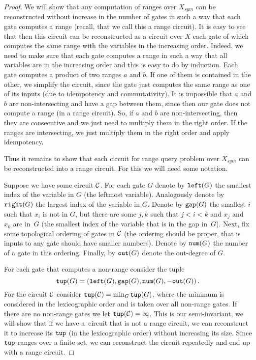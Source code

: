 \documentclass{toc}
\begin{document}
\begin{proof}[Proof]
    We will show that any computation of ranges over $X_{sym}$ can be reconstructed without increase in the number of gates in such a way that each gate computes a range (recall, that we call this a range circuit). It is easy to see that then this circuit can be reconstructed as a circuit over $X$ each gate of which computes the same range with the variables in the increasing order. Indeed, we need to make sure that each gate computes a range in such a way that all variables are in the increasing order and this is easy to do by induction. Each gate computes a product of two ranges $a$ and $b$. If one of them is contained in the other, we simplify the circuit, since the gate just computes the same range as one of its inputs (due to idempotency and commutativity). It is impossible that $a$ and $b$ are non-intersecting and have a gap between them, since then our gate does not compute a range (in a range circuit). So, if $a$ and  $b$ are non-intersecting, then they are consecutive and we just need to multiply them in the right order. If the ranges are intersecting, we just multiply them in the right order and apply idempotency.

    Thus it remains to show that each circuit for range query problem over $X_{sym}$ can be reconstructed into a range circuit. For this we will need some notation.

    Suppose we have some circuit ${\cal C}$. For each gate $G$ denote by $\texttt{left}(G)$ the smallest index of the variable in $G$ (the leftmost variable). Analogously denote by $\texttt{right}(G)$ the largest index of the variable in $G$. Denote by $\texttt{gap}(G)$ the smallest $i$ such that $x_i$ is not in $G$, but there are some $j,k$ such that $j<i<k$ and $x_j$ and $x_k$ are in~$G$ (the smallest index of the variable that is in the gap in~$G$).
    Next, fix some topological ordering of gates in ${\cal C}$ (the ordering should be proper, that is inputs to any gate should have smaller numbers). Denote by $\texttt{num}(G)$ the number of a gate in this ordering. Finally, by $\texttt{out}(G)$ denote the out-degree of $G$.

    For each gate that computes a non-range consider the tuple
    $$
    \texttt{tup}(G)=(\texttt{left}(G),\texttt{gap}(G),\texttt{num}(G),-\texttt{out}(G))\,.
    $$ For the circuit ${\cal C}$ consider $\texttt{tup}({\cal C}) = \min_G \texttt{tup}(G)$, where the minimum is considered in the lexicographic order and is taken over all non-range gates. If there are no non-range gates we let $\texttt{tup}({\cal C})=\infty$. This is our semi-invariant, we will show that if we have a~circuit that is not a range circuit, we can reconstruct it to increase  its $\texttt{tup}$ (in the lexicographic order) without increasing its size. Since $\texttt{tup}$ ranges over a finite set, we can reconstruct the circuit repeatedly and end up with a range circuit.


\end{proof}
\end{document}
